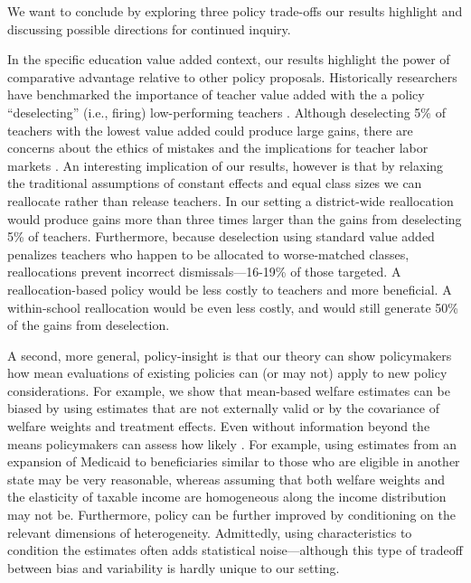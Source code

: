 \documentclass[12pt]{article}
\theoremstyle{definition}
\theoremstyle{definition}
\theoremstyle{definition}
\theoremstyle{definition}
\begin{document}
We want to conclude by exploring three policy trade-offs our results highlight and discussing possible directions for continued inquiry.


In the specific education value added context, our results highlight the power of comparative advantage relative to other policy proposals. Historically researchers have benchmarked the importance of teacher value added with the a policy ``deselecting'' (i.e., firing) low-performing teachers \citep[see][]{hanushek2009teacher,hanushek2011economic,chetty2014measuring2,Delgado2020}. Although deselecting 5\% of teachers with the lowest value added could produce large gains, there are concerns about the ethics of mistakes \citep{staiger2010searching} and the implications for teacher labor markets \citep{rothstein2015teacher}. An interesting implication of our results, however is that by relaxing the traditional assumptions of constant effects and equal class sizes we can reallocate rather than release teachers. In our setting a district-wide reallocation would produce gains more than three times larger than the gains from deselecting 5\% of teachers. Furthermore, because deselection using standard value added penalizes teachers who happen to be allocated to worse-matched classes, reallocations prevent incorrect dismissals---16-19\% of those targeted. A reallocation-based policy would be less costly to teachers and more beneficial. A within-school reallocation would be even less costly, and would still generate 50\% of the gains from deselection.


A second,  more general, policy-insight is that our theory can show policymakers how mean evaluations of existing policies can (or may not) apply to new policy considerations. For example, we show that mean-based welfare estimates can be biased by using estimates that are not externally valid or by the covariance of welfare weights and treatment effects. Even without information beyond the means policymakers can assess how likely . For example, using estimates from an expansion of Medicaid to beneficiaries similar to those who are eligible in another state may be very reasonable, whereas assuming that both welfare weights and the elasticity of taxable income are homogeneous along the income distribution may not be. Furthermore, policy can be further improved by conditioning on the relevant dimensions of heterogeneity. Admittedly, using characteristics to condition the estimates often adds statistical noise---although this type of tradeoff between bias and variability is hardly unique to our setting.
\end{document}

